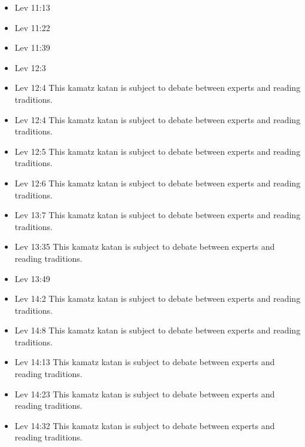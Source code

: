 \documentclass[14pt]{article}
\begin{document}
\begin{multicols}{2}
\begin{itemize}
\item Lev 11:13

\item Lev 11:22

\item Lev 11:39

\item Lev 12:3

\item Lev 12:4 This kamatz katan is subject to debate between experts and reading traditions.

\item Lev 12:4 This kamatz katan is subject to debate between experts and reading traditions.

\item Lev 12:5 This kamatz katan is subject to debate between experts and reading traditions.

\item Lev 12:6 This kamatz katan is subject to debate between experts and reading traditions.

\item Lev 13:7 This kamatz katan is subject to debate between experts and reading traditions.

\item Lev 13:35 This kamatz katan is subject to debate between experts and reading traditions.

\item Lev 13:49

\item Lev 14:2 This kamatz katan is subject to debate between experts and reading traditions.

\item Lev 14:8 This kamatz katan is subject to debate between experts and reading traditions.

\item Lev 14:13 This kamatz katan is subject to debate between experts and reading traditions.

\item Lev 14:23 This kamatz katan is subject to debate between experts and reading traditions.

\item Lev 14:32 This kamatz katan is subject to debate between experts and reading traditions.


\end{itemize}
\end{multicols}
\end{document}
